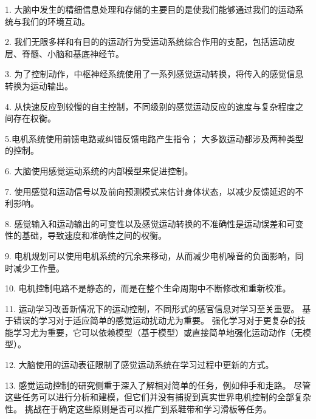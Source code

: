 1. 大脑中发生的精细信息处理和存储的主要目的是使我们能够通过我们的运动系统与我们的环境互动。


2. 我们无限多样和有目的的运动行为受运动系统综合作用的支配，包括运动皮层、脊髓、小脑和基底神经节。


3. 为了控制动作，中枢神经系统使用了一系列感觉运动转换，将传入的感觉信息转换为运动输出。


4. 从快速反应到较慢的自主控制，不同级别的感觉运动反应的速度与复杂程度之间存在权衡。


5.电机系统使用前馈电路或纠错反馈电路产生指令； 大多数运动都涉及两种类型的控制。


6. 大脑使用感觉运动系统的内部模型来促进控制。


7. 使用感觉和运动信号以及前向预测模式来估计身体状态，以减少反馈延迟的不利影响。


8. 感觉输入和运动输出的可变性以及感觉运动转换的不准确性是运动误差和可变性的基础，导致速度和准确性之间的权衡。


9. 电机规划可以使用电机系统的冗余来移动，从而减少电机噪音的负面影响，同时减少工作量。


10. 电机控制电路不是静态的，而是在整个生命周期中不断修改和重新校准。


11. 运动学习改善新情况下的运动控制，不同形式的感官信息对学习至关重要。
基于错误的学习对于适应简单的感觉运动扰动尤为重要。
强化学习对于更复杂的技能学习尤为重要，它可以依赖模型（基于模型）或直接简单地强化运动动作（无模型）。


12. 大脑使用的运动表征限制了感觉运动系统在学习过程中更新的方式。


13. 感觉运动控制的研究侧重于深入了解相对简单的任务，例如伸手和走路。
尽管这些任务可以进行分析和建模，但它们并没有捕捉到真实世界电机控制的全部复杂性。
挑战在于确定这些原则是否可以推广到系鞋带和学习滑板等任务。



